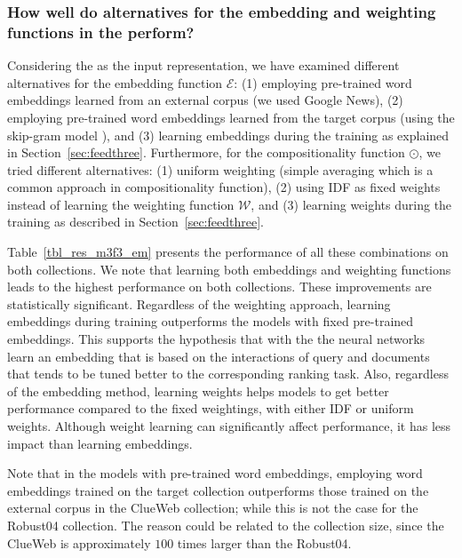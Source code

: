 
\subsubsection{How well do alternatives for the embedding and weighting functions in the \feedthree perform?}
Considering the \feedthree as the input representation, we have examined different alternatives for the embedding function $\mathcal{E}$: (1) employing pre-trained word embeddings learned from an external corpus (we used Google News), (2) employing pre-trained word embeddings learned from the target corpus (using the skip-gram model \cite{Mikolov:2013}), and (3) learning embeddings during the training as explained in Section~\ref{sec:feedthree}. 
Furthermore, for the compositionality function $\odot$, we tried different alternatives: (1) uniform weighting (simple averaging which is a common approach in compositionality function), (2) using IDF as fixed weights instead of learning the weighting function $\mathcal{W}$, and (3) learning weights during the training as described in Section~\ref{sec:feedthree}.

Table~\ref{tbl_res_m3f3_em} presents the performance of all these combinations on both collections. 
We note that learning both embeddings and weighting functions leads to the highest performance on both collections. These improvements are statistically significant.
%
Regardless of the weighting approach, learning embeddings during training outperforms the models with fixed pre-trained embeddings.
%
This supports the hypothesis that with the \feedthree the neural networks learn an embedding that is based on the interactions of query and documents that tends to be tuned better to the corresponding ranking task.
%
Also, regardless of the embedding method, learning weights helps models to get better performance compared to the fixed weightings, with either IDF or uniform weights. 
%
Although weight learning can significantly affect performance, it has less impact than learning embeddings.

Note that in the models with pre-trained word embeddings, employing word embeddings trained on the target collection outperforms those trained on the external corpus in the ClueWeb collection; while this is not the case for the Robust04 collection. The reason could be related to the collection size, since the ClueWeb is approximately $100$ times larger than the Robust04.

